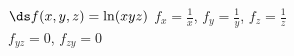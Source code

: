 {$\ds f(x,y,z) = \ln(xyz)$}
{$f_x = \frac1x$, $f_y = \frac1y$, $f_z = \frac1z$\\
$f_{yz} = 0$, $f_{zy} = 0$
}